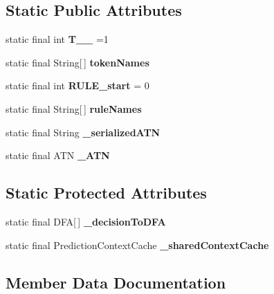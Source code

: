 \subsection*{Static Public Attributes}
\begin{DoxyCompactItemize}
\item 
\hypertarget{classedu_1_1udel_1_1cis_1_1vsl_1_1civl_1_1run_1_1common_1_1CommandParser_a3611f7965c40ef05548893f45040d095}{}static final int {\bfseries T\+\_\+\+\_} =1\label{classedu_1_1udel_1_1cis_1_1vsl_1_1civl_1_1run_1_1common_1_1CommandParser_a3611f7965c40ef05548893f45040d095}

\item 
static final String\mbox{[}$\,$\mbox{]} {\bfseries token\+Names}
\item 
\hypertarget{classedu_1_1udel_1_1cis_1_1vsl_1_1civl_1_1run_1_1common_1_1CommandParser_a30eaac89ea7a6ec3ebc60e1ece6ebdf9}{}static final int {\bfseries R\+U\+L\+E\+\_\+start} = 0\label{classedu_1_1udel_1_1cis_1_1vsl_1_1civl_1_1run_1_1common_1_1CommandParser_a30eaac89ea7a6ec3ebc60e1ece6ebdf9}

\item 
static final String\mbox{[}$\,$\mbox{]} {\bfseries rule\+Names}
\item 
static final String {\bfseries \+\_\+serialized\+A\+T\+N}
\item 
static final A\+T\+N {\bfseries \+\_\+\+A\+T\+N}
\end{DoxyCompactItemize}
\subsection*{Static Protected Attributes}
\begin{DoxyCompactItemize}
\item 
\hypertarget{classedu_1_1udel_1_1cis_1_1vsl_1_1civl_1_1run_1_1common_1_1CommandParser_abc02ab672003cf2f8eddce67baa39313}{}static final D\+F\+A\mbox{[}$\,$\mbox{]} {\bfseries \+\_\+decision\+To\+D\+F\+A}\label{classedu_1_1udel_1_1cis_1_1vsl_1_1civl_1_1run_1_1common_1_1CommandParser_abc02ab672003cf2f8eddce67baa39313}

\item 
static final Prediction\+Context\+Cache {\bfseries \+\_\+shared\+Context\+Cache}
\end{DoxyCompactItemize}


\subsection{Member Data Documentation}
\hypertarget{classedu_1_1udel_1_1cis_1_1vsl_1_1civl_1_1run_1_1common_1_1CommandParser_a56b98810c4c0ca7d443181cd461217df}{}
